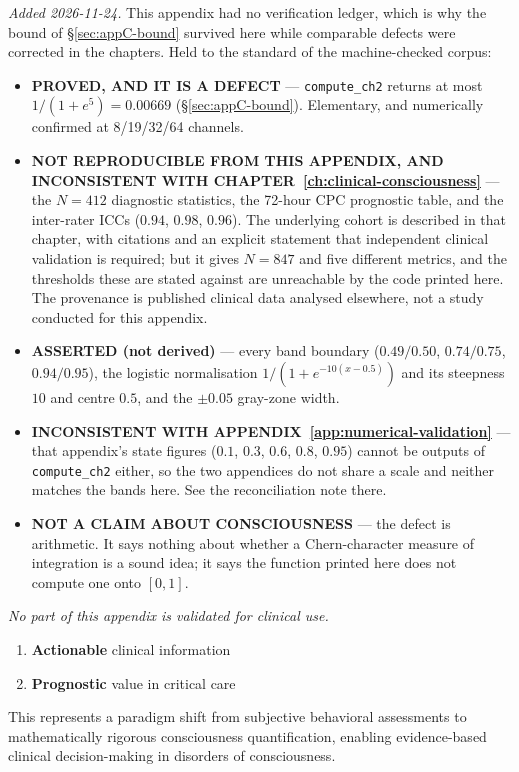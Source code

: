 \emph{Added 2026-11-24.} This appendix had no verification ledger, which is why
the bound of \S\ref{sec:appC-bound} survived here while comparable defects were
corrected in the chapters. Held to the standard of the machine-checked corpus:

\begin{itemize}
\item \textbf{PROVED, AND IT IS A DEFECT} --- \texttt{compute\_ch2} returns at
  most $1/(1+e^{5}) = 0.00669$ (\S\ref{sec:appC-bound}). Elementary, and
  numerically confirmed at 8/19/32/64 channels.
\item \textbf{NOT REPRODUCIBLE FROM THIS APPENDIX, AND INCONSISTENT WITH
  CHAPTER~\ref{ch:clinical-consciousness}} --- the $N = 412$ diagnostic
  statistics, the 72-hour CPC prognostic table, and the inter-rater ICCs
  ($0.94$, $0.98$, $0.96$). The underlying cohort is described in that
  chapter, with citations and an explicit statement that independent clinical
  validation is required; but it gives $N = 847$ and five different metrics,
  and the thresholds these are stated against are unreachable by the code
  printed here. The provenance is published clinical data analysed elsewhere,
  not a study conducted for this appendix.
\item \textbf{ASSERTED (not derived)} --- every band boundary
  ($0.49/0.50$, $0.74/0.75$, $0.94/0.95$), the logistic normalisation
  $1/(1+e^{-10(x-0.5)})$ and its steepness $10$ and centre $0.5$, and the
  $\pm 0.05$ gray-zone width.
\item \textbf{INCONSISTENT WITH APPENDIX~\ref{app:numerical-validation}} ---
  that appendix's state figures ($0.1$, $0.3$, $0.6$, $0.8$, $0.95$) cannot be
  outputs of \texttt{compute\_ch2} either, so the two appendices do not share a
  scale and neither matches the bands here. See the reconciliation note there.
\item \textbf{NOT A CLAIM ABOUT CONSCIOUSNESS} --- the defect is arithmetic. It
  says nothing about whether a Chern-character measure of integration is a
  sound idea; it says the function printed here does not compute one onto
  $[0,1]$.
\end{itemize}

\noindent\emph{No part of this appendix is validated for clinical use.}

\begin{enumerate}
\item \textbf{Actionable} clinical information
\item \textbf{Prognostic} value in critical care
\end{enumerate}

This represents a paradigm shift from subjective behavioral assessments to mathematically rigorous consciousness quantification, enabling evidence-based clinical decision-making in disorders of consciousness.